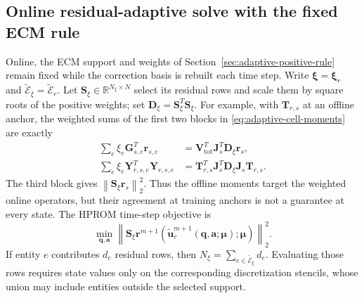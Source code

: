 \documentclass[11pt]{article}
\newcommand{\q}{\mathbf q}
\newcommand{\utilde}{\widetilde{\mathbf u}}
\newcommand{\mub}{\bm\mu}
\newcommand{\norm}[1]{\left\lVert #1 \right\rVert}
\begin{document}
\subsection{Online residual-adaptive solve with the fixed ECM rule}
\label{sec:adaptive-sampling}
Online, the ECM support and weights of
Section~\ref{sec:adaptive-positive-rule} remain fixed while the correction
basis is rebuilt each time step.  Write
$\boldsymbol\xi=\boldsymbol\xi_r$ and
$\widetilde{\mathcal E}_\xi=\widetilde{\mathcal E}_r$.  Let
$\mathbf S_\xi\in\mathbb R^{N_\xi\times N}$ select its
residual rows and scale them by square roots of the positive weights;
set $\mathbf D_\xi=\mathbf S_\xi^T\mathbf S_\xi$.  For example, with
$\mathbf T_{r,s}$ at an offline anchor, the weighted sums of the first two blocks in
\eqref{eq:adaptive-cell-moments} are exactly
\begin{equation}
\begin{aligned}
\sum_e\xi_e\mathbf G_{s,e}^T\mathbf r_{s,e}
&=\mathbf V_{\mathrm{tot}}^T\mathbf J_s^T
\mathbf D_\xi\mathbf r_s,\\
\sum_e\xi_e\mathbf Y_{r,s,e}^T\mathbf Y_{r,s,e}
&=\mathbf T_{r,s}^T\mathbf J_s^T\mathbf D_\xi
\mathbf J_s\mathbf T_{r,s}.
\end{aligned}
\label{eq:adaptive-moment-weighted-operators}
\end{equation}
The third block gives $\norm{\mathbf S_\xi\mathbf r_s}_2^2$.
Thus the offline moments target the weighted online operators, but their
agreement at training anchors is not a guarantee at every state.
The HPROM time-step objective is
\begin{equation}
\min_{\q,\mathbf a}
\norm{\mathbf S_\xi\mathbf r^{m+1}
(\utilde_r^{m+1}(\q,\mathbf a;\mub);\mub)}_2^2.
\label{eq:adaptive-sampled-objective}
\end{equation}
If entity $e$ contributes $d_e$ residual rows, then
$N_\xi=\sum_{e\in\widetilde{\mathcal E}_\xi}d_e$.  Evaluating those rows
requires state values only on the corresponding discretization stencils,
whose union may include entities outside the selected support.
\end{document}
